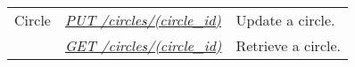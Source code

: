 \documentclass[letterpaper,10pt,english]{sphinxmanual}
\begin{document}
\noindent\begin{tabulary}{\linewidth}{|L|L|L|}
\hline
{}\relax &\relax &\relax \\
\hline
Circle
&
{\hyperref[\detokenize{resources/circle:put--circles-(circle_id)}]{\emph{PUT /circles/(circle\_id)}}}
&
Update a circle.
\\
\hline&
{\hyperref[\detokenize{resources/circle:get--circles-(circle_id)}]{\emph{GET /circles/(circle\_id)}}}
&
Retrieve a circle.
\\
\hline\end{tabulary}


\begin{DUlineblock}{0em}
\item[] 
\end{DUlineblock}
\end{document}
